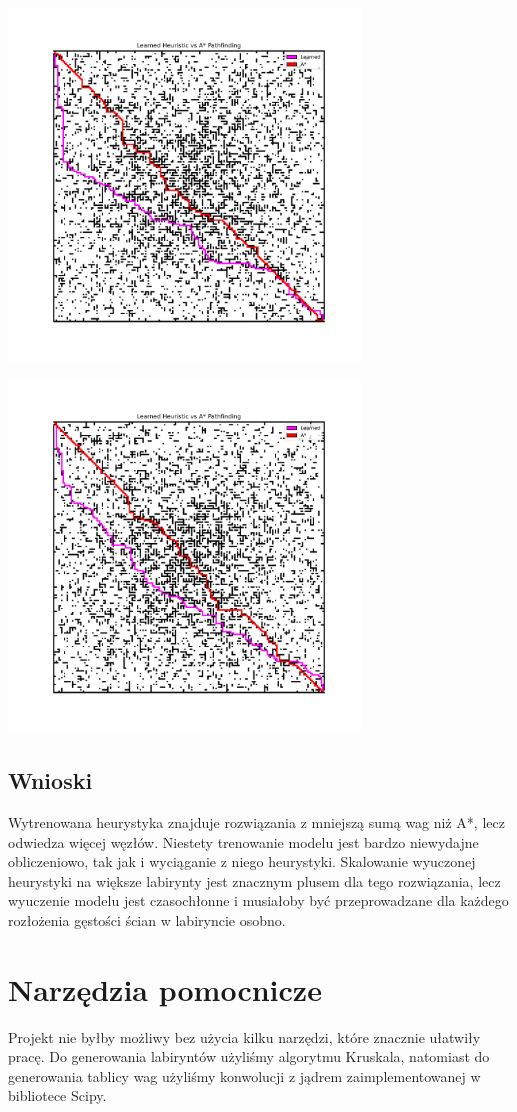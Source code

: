 \documentclass[a4paper,12pt]{article}
\begin{document}
  \begin{center}
    \includegraphics[width=0.7\textwidth]{../images/interesting_case1.png}
  \end{center}
  \begin{center}
    \includegraphics[width=0.7\textwidth]{../images/interesting_case2.png}
  \end{center}

  \subsection{Wnioski}
  Wytrenowana heurystyka znajduje rozwiązania z mniejszą sumą wag niż A*,
  lecz odwiedza więcej węzłów. Niestety trenowanie modelu jest bardzo niewydajne
  obliczeniowo, tak jak i wyciąganie z niego heurystyki. Skalowanie wyuczonej
  heurystyki na większe labirynty jest znacznym plusem dla tego rozwiązania,
  lecz wyuczenie modelu jest czasochłonne i musiałoby być przeprowadzane dla
  każdego rozłożenia gęstości ścian w labiryncie osobno.

  \section{Narzędzia pomocnicze}
  Projekt nie byłby możliwy bez użycia kilku narzędzi, które znacznie
  ułatwiły pracę. Do generowania labiryntów użyliśmy algorytmu Kruskala,
  natomiast do generowania tablicy wag użyliśmy konwolucji z jądrem
  zaimplementowanej w bibliotece Scipy.
\end{document}
